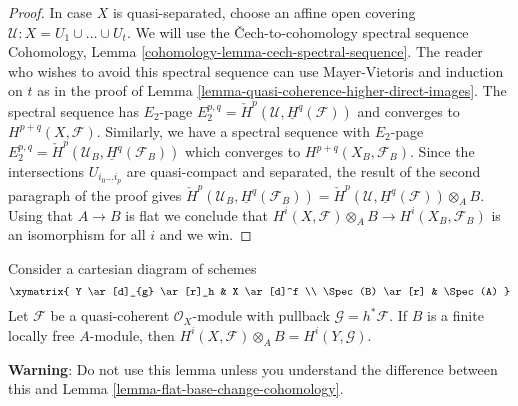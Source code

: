 \begin{proof}
\medskip\noindent
In case $X$ is quasi-separated, choose an affine open covering
$\mathcal{U} : X = U_1 \cup \ldots \cup U_t$. We will use the
{\v C}ech-to-cohomology spectral sequence
Cohomology, Lemma \ref{cohomology-lemma-cech-spectral-sequence}.
The reader who wishes to avoid this spectral sequence
can use Mayer-Vietoris and induction on $t$ as in the proof of
Lemma \ref{lemma-quasi-coherence-higher-direct-images}.
The spectral sequence has $E_2$-page
$E_2^{p, q} = \check{H}^p(\mathcal{U}, \underline{H}^q(\mathcal{F}))$
and converges to $H^{p + q}(X, \mathcal{F})$.
Similarly, we have a spectral sequence with $E_2$-page
$E_2^{p, q} = \check{H}^p(\mathcal{U}_B, \underline{H}^q(\mathcal{F}_B))$
which converges to $H^{p + q}(X_B, \mathcal{F}_B)$.
Since the intersections $U_{i_0 \ldots i_p}$ are quasi-compact
and separated, the result of the second paragraph of the proof gives
$\check{H}^p(\mathcal{U}_B, \underline{H}^q(\mathcal{F}_B)) =
\check{H}^p(\mathcal{U}, \underline{H}^q(\mathcal{F})) \otimes_A B$.
Using that $A \to B$ is flat we conclude that
$H^i(X, \mathcal{F}) \otimes_A B \to H^i(X_B, \mathcal{F}_B)$
is an isomorphism for all $i$ and we win.
\end{proof}

\begin{lemma}
\label{lemma-finite-locally-free-base-change-cohomology}
Consider a cartesian diagram of schemes
$$
\xymatrix{
Y \ar[d]_{g} \ar[r]_h & X \ar[d]^f \\
\Spec(B) \ar[r] & \Spec(A)
}
$$
Let $\mathcal{F}$ be a quasi-coherent $\mathcal{O}_X$-module
with pullback $\mathcal{G} = h^*\mathcal{F}$.
If $B$ is a finite locally free $A$-module, then
$H^i(X, \mathcal{F}) \otimes_A B = H^i(Y, \mathcal{G})$.
\end{lemma}

\noindent
{\bf Warning}: Do not use this lemma unless you understand the difference
between this and Lemma \ref{lemma-flat-base-change-cohomology}.


